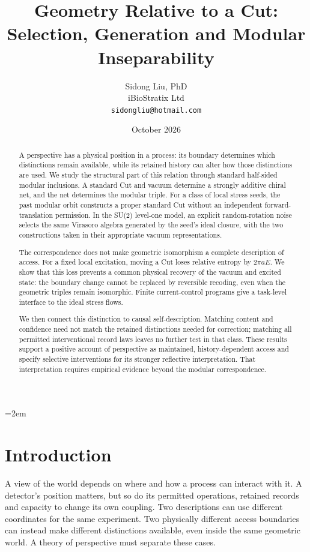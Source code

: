 \documentclass[12pt]{article}
\title{%
  \textbf{Geometry Relative to a Cut:}\\
  \textbf{Selection, Generation and Modular Inseparability}%
}
\author{
  Sidong Liu, PhD \\
  \small iBioStratix Ltd \\
  \small \texttt{sidongliu@hotmail.com}
}
\date{October 2026}
\theoremstyle{definition}
\theoremstyle{remark}
\begin{document}
\emergencystretch=2em
\raggedbottom
{}

\maketitle

\begin{abstract}
A perspective has a physical position in a process: its boundary determines which distinctions remain available, while its retained history can alter how those distinctions are used. We study the structural part of this relation through standard half-sided modular inclusions. A standard Cut and vacuum determine a strongly additive chiral net, and the net determines the modular triple. For a class of local stress seeds, the past modular orbit constructs a proper standard Cut without an independent forward-translation permission. In the SU(2) level-one model, an explicit random-rotation noise selects the same Virasoro algebra generated by the seed's ideal closure, with the two constructions taken in their appropriate vacuum representations.

The correspondence does not make geometric isomorphism a complete description of access. For a fixed local excitation, moving a Cut loses relative entropy by \(2\pi aE\). We show that this loss prevents a common physical recovery of the vacuum and excited state: the boundary change cannot be replaced by reversible recoding, even when the geometric triples remain isomorphic. Finite current-control programs give a task-level interface to the ideal stress flows.

We then connect this distinction to causal self-description. Matching content and confidence need not match the retained distinctions needed for correction; matching all permitted interventional record laws leaves no further test in that class. These results support a positive account of perspective as maintained, history-dependent access and specify selective interventions for its stronger reflective interpretation. That interpretation requires empirical evidence beyond the modular correspondence.
\end{abstract}

\section{Introduction}\label{sec:intro}

A view of the world depends on where and how a process can interact with it.
A detector's position matters, but so do its permitted operations, retained
records and capacity to change its own coupling. Two descriptions can use
different coordinates for the same experiment. Two physically different
access boundaries can instead make different distinctions available, even
inside the same geometric world. A theory of perspective must separate
these cases.
\end{document}

